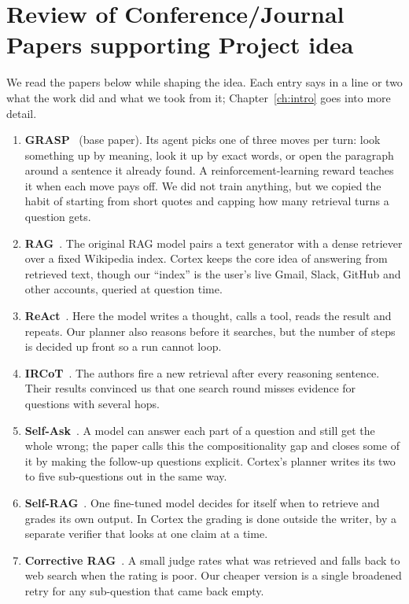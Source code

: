 \documentclass[oneside,a4paper,12pt]{report}
\begin{document}
\section{Review of Conference/Journal Papers supporting Project idea}
\label{sec:survey}
We read the papers below while shaping the idea. Each entry says in a line or two what the work did and what we took from it; Chapter~\ref{ch:intro} goes into more detail.
\begin{enumerate}
\item \textbf{GRASP}~\cite{grasp2026} (base paper). Its agent picks one of three moves per turn: look something up by meaning, look it up by exact words, or open the paragraph around a sentence it already found. A reinforcement-learning reward teaches it when each move pays off. We did not train anything, but we copied the habit of starting from short quotes and capping how many retrieval turns a question gets.
\item \textbf{RAG}~\cite{lewis2020rag}. The original RAG model pairs a text generator with a dense retriever over a fixed Wikipedia index. Cortex keeps the core idea of answering from retrieved text, though our ``index'' is the user's live Gmail, Slack, GitHub and other accounts, queried at question time.
\item \textbf{ReAct}~\cite{yao2023react}. Here the model writes a thought, calls a tool, reads the result and repeats. Our planner also reasons before it searches, but the number of steps is decided up front so a run cannot loop.
\item \textbf{IRCoT}~\cite{trivedi2023ircot}. The authors fire a new retrieval after every reasoning sentence. Their results convinced us that one search round misses evidence for questions with several hops.
\item \textbf{Self-Ask}~\cite{press2023selfask}. A model can answer each part of a question and still get the whole wrong; the paper calls this the compositionality gap and closes some of it by making the follow-up questions explicit. Cortex's planner writes its two to five sub-questions out in the same way.
\item \textbf{Self-RAG}~\cite{asai2024selfrag}. One fine-tuned model decides for itself when to retrieve and grades its own output. In Cortex the grading is done outside the writer, by a separate verifier that looks at one claim at a time.
\item \textbf{Corrective RAG}~\cite{yan2024crag}. A small judge rates what was retrieved and falls back to web search when the rating is poor. Our cheaper version is a single broadened retry for any sub-question that came back empty.

\end{enumerate}
\end{document}
